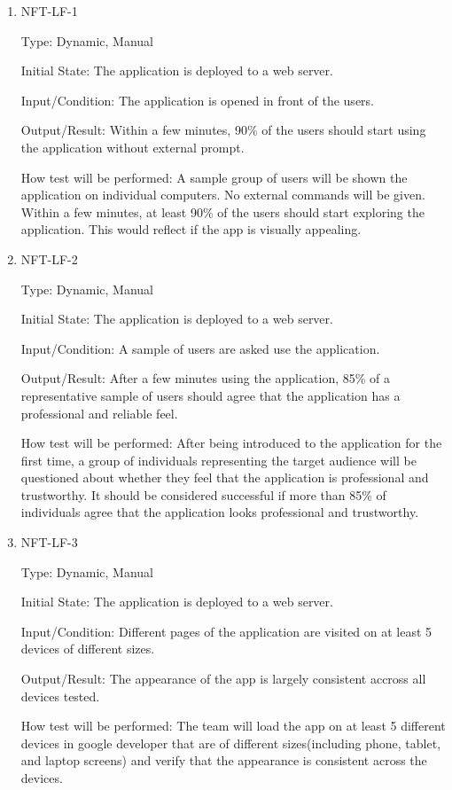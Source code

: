 \documentclass[12pt, titlepage]{article}
\begin{document}
\begin{enumerate}

\item{NFT-LF-1}

Type: Dynamic, Manual
					
Initial State: The application is deployed to a web server.
					
Input/Condition: The application is opened in front of the users.
					
Output/Result: Within a few minutes, 90\% of the users should start using the application without external prompt.
					
How test will be performed: A sample group of users will be shown the application on individual computers. No external commands will be given. Within a few minutes, at least 90\% of the users should start exploring the application. This would reflect if the app is visually appealing.

\item{NFT-LF-2}

Type: Dynamic, Manual
					
Initial State: The application is deployed to a web server.
					
Input/Condition: A sample of users are asked use the application.
					
Output/Result: After a few minutes using the application, 85\% of a representative sample of users should agree that the application has a professional and reliable feel.
					
How test will be performed: After being introduced to the application for the first time, a group of individuals representing the target audience will be questioned about whether they feel that the application is professional and trustworthy. It should be considered successful if more than 85\% of individuals agree that the application looks professional and trustworthy.

\item{NFT-LF-3}

Type: Dynamic, Manual
					
Initial State: The application is deployed to a web server.
					
Input/Condition: Different pages of the application are visited on at least 5  devices of different sizes.
					
Output/Result: The appearance of the app is largely consistent accross all devices tested.
					
How test will be performed: The team will load the app on at least 5 different devices in google developer that are of different sizes(including phone, tablet, and laptop screens) and verify that the appearance is consistent across the devices.

\end{enumerate}
\end{document}
